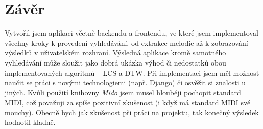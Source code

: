 \section{Závěr}
Vytvořil jsem aplikaci včetně backendu a frontendu, ve které jsem implementoval všechny kroky k provedení vyhledávání, od extrakce melodie až k zobrazování výsledků v uživatelském rozhraní. Výsledná aplikace kromě samotného vyhledávání může sloužit jako dobrá ukázka výhod či nedostatků obou implementovaných algoritmů -- LCS a DTW. Při implementaci jsem měl možnost naučit se práci s novými technologiemi (např. Django) či osvěžit si znalosti u jiných. Kvůli použití knihovny \textit{Mido} jsem musel hlouběji pochopit standard MIDI, což považuji za spíše pozitivní zkušenost (i když má standard MIDI své mouchy). Obecně bych jak zkušenost při práci na projektu, tak konečný výsledek hodnotil kladně.